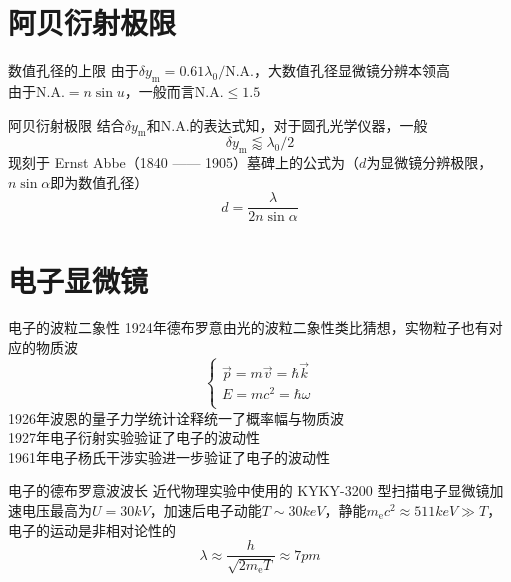 \section{阿贝衍射极限}

\begin{slide}
  \begin{itemlist}
    \item{数值孔径的上限}
      由于$\delta y_{\mathrm m} = 0.61\lambda_0 / \mathrm{N.A.}$，大数值孔径显微镜分辨本领高 \\
      由于$\mathrm{N.A.} = n\sin u$，一般而言$\mathrm{N.A.} \leq 1.5$
    \item{阿贝衍射极限}
      结合$\delta y_{\mathrm m}$和$\mathrm{N.A.}$的表达式知，对于圆孔光学仪器，一般
      $$\boxed{\delta y_{\mathrm m} \lessapprox \lambda_0 / 2}$$
      现刻于 Ernst Abbe（1840 —— 1905）墓碑上的公式为（$d$为显微镜分辨极限，$n\sin\alpha$即为数值孔径）
      $$\boxed{d = \frac{\lambda}{2n\sin\alpha}}$$
  \end{itemlist}
\end{slide}

\section{电子显微镜}

\begin{slide}
  \begin{itemlist}
    \item{电子的波粒二象性}
      1924年德布罗意由光的波粒二象性类比猜想，实物粒子也有对应的物质波
      $$
      \begin{cases}
        \vec p = m\vec v = \hbar\vec k \\
        E = mc^2 = \hbar\omega \\
      \end{cases}
      $$
      1926年波恩的量子力学统计诠释统一了概率幅与物质波 \\
      1927年电子衍射实验验证了电子的波动性 \\
      1961年电子杨氏干涉实验进一步验证了电子的波动性
    \item{电子的德布罗意波波长}
      近代物理实验中使用的 KYKY-3200 型扫描电子显微镜加速电压最高为$U = 30\unit{kV}$，加速后电子动能$T \sim 30\unit{keV}$，静能$m_{\mathrm e}c^2 \approx 511\unit{keV} \gg T$，电子的运动是非相对论性的
      $$
      \boxed{
        \lambda \approx \frac{h}{\sqrt{2m_{\mathrm e}T}} \approx 7\unit{pm}
      }
      $$
  \end{itemlist}
\end{slide}

